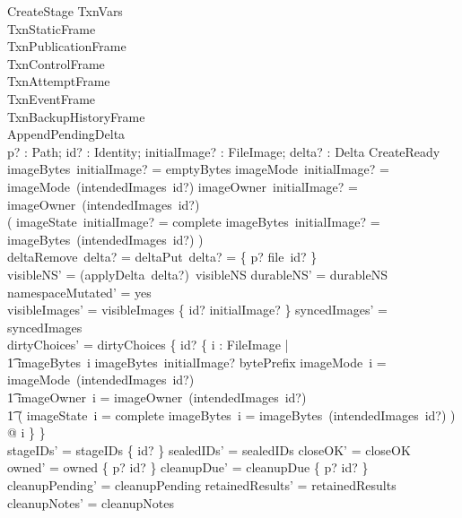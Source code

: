\documentclass{article}
\begin{document}
\begin{schema}{CreateStage}
	\Delta TxnVars \\
	TxnStaticFrame \\
	TxnPublicationFrame \\
	TxnControlFrame \\
	TxnAttemptFrame \\
	TxnEventFrame \\
	TxnBackupHistoryFrame \\
	AppendPendingDelta \\
	p? : Path; id? : Identity; initialImage? : FileImage; delta? : Delta
	\where
	CreateReady \\
	imageBytes~initialImage? = emptyBytes \land
	imageMode~initialImage? = imageMode~(intendedImages~id?) \land
	imageOwner~initialImage? = imageOwner~(intendedImages~id?) \\
	( imageState~initialImage? = complete \iff
	imageBytes~initialImage? = imageBytes~(intendedImages~id?) ) \\
	deltaRemove~delta? = \emptyset \land
	deltaPut~delta? = \{ p? \mapsto file~id? \} \\
	visibleNS' = (applyDelta~delta?)~visibleNS \land durableNS' = durableNS \land
	namespaceMutated' = yes \\
	visibleImages' = visibleImages \oplus \{ id? \mapsto initialImage? \} \land
	syncedImages' = syncedImages \\
	dirtyChoices' = dirtyChoices \oplus \{ id? \mapsto \{ i : FileImage | \\
	\t1 imageBytes~i \mapsto imageBytes~initialImage? \in bytePrefix \land
	imageMode~i = imageMode~(intendedImages~id?) \land \\
	\t1 imageOwner~i = imageOwner~(intendedImages~id?) \land \\
	\t1 ( imageState~i = complete \iff
	imageBytes~i = imageBytes~(intendedImages~id?) ) @ i \} \} \\
	stageIDs' = stageIDs \cup \{ id? \} \land sealedIDs' = sealedIDs \land
	closeOK' = closeOK \\
	owned' = owned \oplus \{ p? \mapsto id? \} \land
	cleanupDue' = cleanupDue \oplus \{ p? \mapsto id? \} \land
	cleanupPending' = cleanupPending \land retainedResults' = retainedResults \land
	cleanupNotes' = cleanupNotes
\end{schema}
\end{document}
